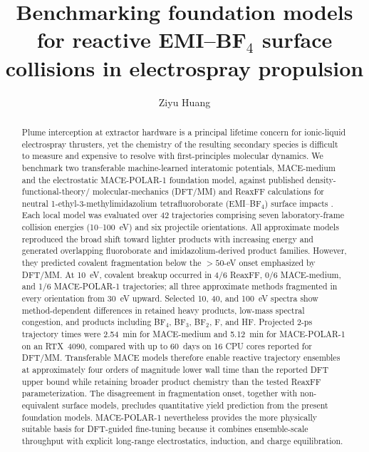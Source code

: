 \documentclass[preprint,review,12pt]{elsarticle}
\begin{document}
\begin{frontmatter}

\title{Benchmarking foundation models for reactive
EMI--BF$_4$ surface collisions in electrospray propulsion}

\author[aff1]{Ziyu Huang} 


\begin{abstract}
Plume interception at extractor hardware is a principal lifetime concern for
ionic-liquid electrospray thrusters, yet the chemistry of the resulting
secondary species is difficult to measure and expensive to resolve with
first-principles molecular dynamics. We benchmark two transferable
machine-learned interatomic potentials, MACE-medium and the electrostatic
MACE-POLAR-1 foundation model, against published density-functional-theory/
molecular-mechanics (DFT/MM) and ReaxFF calculations for neutral
1-ethyl-3-methylimidazolium tetrafluoroborate (EMI--BF$_4$) surface impacts .
Each local model was evaluated over 42 trajectories comprising seven
laboratory-frame collision energies (10--100~eV) and six projectile
orientations. All approximate models reproduced the broad shift toward
lighter products with increasing energy and generated overlapping
fluoroborate and imidazolium-derived product families. However, they predicted
covalent fragmentation below the \(>50\)-eV onset emphasized by DFT/MM. At
10~eV, covalent breakup occurred in 4/6 ReaxFF, 0/6 MACE-medium, and 1/6
MACE-POLAR-1 trajectories; all three approximate methods fragmented in every
orientation from 30~eV upward. Selected 10, 40, and 100~eV spectra show
method-dependent differences in retained heavy products, low-mass spectral
congestion, and products including BF$_4$, BF$_3$, BF$_2$, F, and HF.
Projected 2-ps
trajectory times were 2.54~min for MACE-medium and 5.12~min for MACE-POLAR-1
on an RTX~4090, compared with up to 60~days on 16 CPU cores reported for
DFT/MM. Transferable MACE models therefore enable reactive trajectory
ensembles at approximately four orders of magnitude lower wall time than the
reported DFT upper bound while retaining broader product chemistry than the
tested ReaxFF parameterization. The disagreement in fragmentation onset,
together with non-equivalent surface models, precludes quantitative yield
prediction from the present foundation models. MACE-POLAR-1 nevertheless
provides the more physically suitable basis
for DFT-guided fine-tuning because it combines ensemble-scale throughput with
explicit long-range electrostatics, induction, and charge equilibration.
\end{abstract}


\end{frontmatter}
\end{document}

